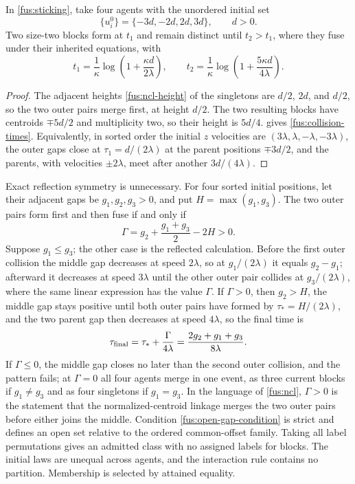 In \cref{fus:sticking}, take four agents with the unordered initial set
\begin{equation}
 \{u_i^0\}=\{-3d,-2d,2d,3d\},\qquad d>0.
\end{equation}
Two size-two blocks form at $t_1$ and remain distinct until $t_2>t_1$, where
they fuse under their inherited equations, with
\begin{equation}
 t_1=\frac1\kappa\log\left(1+\frac{\kappa d}{2\lambda}\right),\qquad
 t_2=\frac1\kappa\log\left(1+\frac{5\kappa d}{4\lambda}\right).
 \label{fus:collision-times}
\end{equation}
\begin{proof}
The adjacent heights \cref{fus:ncl-height} of the singletons are $d/2$,
$2d$, and $d/2$, so the two outer pairs merge first, at height $d/2$. The
two resulting blocks have centroids $\mp5d/2$ and multiplicity two, so their
height is $5d/4$.  gives \cref{fus:collision-times}.
Equivalently, in sorted order the initial $z$ velocities are
$(3\lambda,\lambda,-\lambda,-3\lambda)$, the outer gaps close at
$\tau_1=d/(2\lambda)$ at the parent positions $\mp3d/2$, and the parents,
with velocities $\pm2\lambda$, meet after another $3d/(4\lambda)$.
\end{proof}

Exact reflection symmetry is unnecessary. For four sorted initial positions,
let their adjacent gaps be $g_1,g_2,g_3>0$, and put $H=\max(g_1,g_3)$. The
two outer pairs form first and then fuse if and only if
\begin{equation}
 \Gamma=g_2+\frac{g_1+g_3}{2}-2H>0.
 \label{fus:open-gap-condition}
\end{equation}
Suppose $g_1\leq g_3$; the other case is the reflected calculation. Before
the first outer collision the middle gap decreases at speed $2\lambda$, so
at $g_1/(2\lambda)$ it equals $g_2-g_1$; afterward it decreases at speed
$3\lambda$ until the other outer pair collides at $g_3/(2\lambda)$, where
the same linear expression has the value $\Gamma$. If $\Gamma>0$, then
$g_2>H$, the middle gap stays positive until both outer pairs have formed by
$\tau_*=H/(2\lambda)$, and the two parent gap then decreases at speed
$4\lambda$, so the final time is
\begin{equation}
 \tau_{\rm final}=\tau_*+\frac{\Gamma}{4\lambda}
 =\frac{2g_2+g_1+g_3}{8\lambda}.
\end{equation}
If $\Gamma\leq0$, the middle gap closes no later than the second outer
collision, and the pattern fails; at $\Gamma=0$ all four agents merge in one
event, as three current blocks if $g_1\neq g_3$ and as four singletons if
$g_1=g_3$. In the language of \cref{fus:ncl}, $\Gamma>0$ is the statement
that the normalized-centroid linkage merges the two outer pairs before
either joins the middle. Condition \cref{fus:open-gap-condition} is strict
and defines an open set relative to the ordered common-offset family. Taking
all label permutations gives an admitted class with no assigned labels for
blocks. The initial laws are unequal across agents, and the interaction rule
contains no partition. Membership is selected by attained equality.

